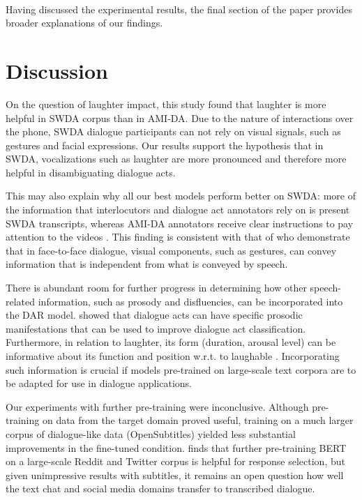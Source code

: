 \documentclass[11pt,a4paper]{article}
\begin{document}
\paragraph{}
Having discussed the experimental results, the final section of the paper provides broader explanations of our findings.

\section{Discussion} %
On the question of laughter impact, this study found that laughter is more helpful in SWDA corpus than in AMI-DA.
Due to the nature of interactions over the phone, SWDA dialogue participants can not rely on visual signals, such as gestures and facial expressions.
Our results support the hypothesis that in SWDA, vocalizations such as laughter are more pronounced and therefore more helpful in disambiguating dialogue acts.

This may also explain why all our best models perform better on SWDA: more of the information that interlocutors and dialogue act annotators rely on is present SWDA transcripts, whereas AMI-DA annotators receive clear instructions to pay attention to the videos \citep{GuidelinesDialogueAct2005}.
This finding is consistent with that of \citet{bavelas2008gesturing} who demonstrate that in face-to-face dialogue, visual components, such as gestures, can convey information that is independent from what is conveyed by speech.

There is abundant room for further progress in determining how other speech-related information, such as prosody and disfluencies, can be incorporated into the DAR model.
\citet{stolckeDialogueActModeling2000} showed that dialogue acts can have specific prosodic manifestations that can be used to improve dialogue act classification.
Furthermore, in relation to laughter, its form (duration, arousal level) can be informative about its function and position w.r.t. to laughable \citep{tian2016we,mazzocconi2019phd}.
Incorporating such information is crucial if models pre-trained on large-scale text corpora are to be adapted for use in dialogue applications.

Our experiments with further pre-training were inconclusive. 
Although pre-training on data from the target domain proved useful, training on a much larger corpus of dialogue-like data (OpenSubtitles) yielded less substantial improvements in the fine-tuned condition.
\citet{baoPLATOPretrainedDialogue2019} finds that further pre-training BERT on a large-scale Reddit and Twitter corpus is helpful for response selection, but given unimpressive results with subtitles, it remains an open question how well the text chat and social media domains transfer to transcribed dialogue.
\end{document}
